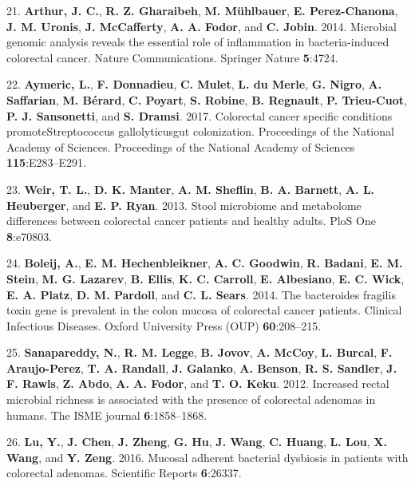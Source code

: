 \documentclass[12pt,]{article}
\begin{document}
\hypertarget{ref-ecoli_Arthur_2014}{}
21. \textbf{Arthur, J. C.}, \textbf{R. Z. Gharaibeh}, \textbf{M.
Mühlbauer}, \textbf{E. Perez-Chanona}, \textbf{J. M. Uronis}, \textbf{J.
McCafferty}, \textbf{A. A. Fodor}, and \textbf{C. Jobin}. 2014.
Microbial genomic analysis reveals the essential role of inflammation in
bacteria-induced colorectal cancer. Nature Communications. Springer
Nature \textbf{5}:4724.

\hypertarget{ref-strep_Aymeric_2017}{}
22. \textbf{Aymeric, L.}, \textbf{F. Donnadieu}, \textbf{C. Mulet},
\textbf{L. du Merle}, \textbf{G. Nigro}, \textbf{A. Saffarian},
\textbf{M. Bérard}, \textbf{C. Poyart}, \textbf{S. Robine}, \textbf{B.
Regnault}, \textbf{P. Trieu-Cuot}, \textbf{P. J. Sansonetti}, and
\textbf{S. Dramsi}. 2017. Colorectal cancer specific conditions
promoteStreptococcus gallolyticusgut colonization. Proceedings of the
National Academy of Sciences. Proceedings of the National Academy of
Sciences \textbf{115}:E283--E291.

\hypertarget{ref-weir_stool_2013}{}
23. \textbf{Weir, T. L.}, \textbf{D. K. Manter}, \textbf{A. M. Sheflin},
\textbf{B. A. Barnett}, \textbf{A. L. Heuberger}, and \textbf{E. P.
Ryan}. 2013. Stool microbiome and metabolome differences between
colorectal cancer patients and healthy adults. PloS One
\textbf{8}:e70803.

\hypertarget{ref-bfrag_Boleij_2014}{}
24. \textbf{Boleij, A.}, \textbf{E. M. Hechenbleikner}, \textbf{A. C.
Goodwin}, \textbf{R. Badani}, \textbf{E. M. Stein}, \textbf{M. G.
Lazarev}, \textbf{B. Ellis}, \textbf{K. C. Carroll}, \textbf{E.
Albesiano}, \textbf{E. C. Wick}, \textbf{E. A. Platz}, \textbf{D. M.
Pardoll}, and \textbf{C. L. Sears}. 2014. The bacteroides fragilis toxin
gene is prevalent in the colon mucosa of colorectal cancer patients.
Clinical Infectious Diseases. Oxford University Press (OUP)
\textbf{60}:208--215.

\hypertarget{ref-sanapareddy_increased_2012}{}
25. \textbf{Sanapareddy, N.}, \textbf{R. M. Legge}, \textbf{B. Jovov},
\textbf{A. McCoy}, \textbf{L. Burcal}, \textbf{F. Araujo-Perez},
\textbf{T. A. Randall}, \textbf{J. Galanko}, \textbf{A. Benson},
\textbf{R. S. Sandler}, \textbf{J. F. Rawls}, \textbf{Z. Abdo},
\textbf{A. A. Fodor}, and \textbf{T. O. Keku}. 2012. Increased rectal
microbial richness is associated with the presence of colorectal
adenomas in humans. The ISME journal \textbf{6}:1858--1868.

\hypertarget{ref-lu_mucosal_2016}{}
26. \textbf{Lu, Y.}, \textbf{J. Chen}, \textbf{J. Zheng}, \textbf{G.
Hu}, \textbf{J. Wang}, \textbf{C. Huang}, \textbf{L. Lou}, \textbf{X.
Wang}, and \textbf{Y. Zeng}. 2016. Mucosal adherent bacterial dysbiosis
in patients with colorectal adenomas. Scientific Reports
\textbf{6}:26337.
\end{document}
